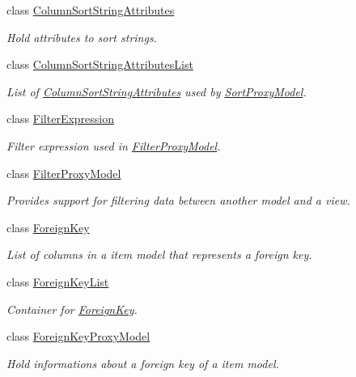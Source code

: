 \begin{DoxyCompactItemize}
class \hyperlink{class_mdt_1_1_item_model_1_1_column_sort_string_attributes}{Column\+Sort\+String\+Attributes}
\begin{DoxyCompactList}\small\item\em Hold attributes to sort strings. \end{DoxyCompactList}\item 
class \hyperlink{class_mdt_1_1_item_model_1_1_column_sort_string_attributes_list}{Column\+Sort\+String\+Attributes\+List}
\begin{DoxyCompactList}\small\item\em List of \hyperlink{class_mdt_1_1_item_model_1_1_column_sort_string_attributes}{Column\+Sort\+String\+Attributes} used by \hyperlink{class_mdt_1_1_item_model_1_1_sort_proxy_model}{Sort\+Proxy\+Model}. \end{DoxyCompactList}\item 
class \hyperlink{class_mdt_1_1_item_model_1_1_filter_expression}{Filter\+Expression}
\begin{DoxyCompactList}\small\item\em Filter expression used in \hyperlink{class_mdt_1_1_item_model_1_1_filter_proxy_model}{Filter\+Proxy\+Model}. \end{DoxyCompactList}\item 
class \hyperlink{class_mdt_1_1_item_model_1_1_filter_proxy_model}{Filter\+Proxy\+Model}
\begin{DoxyCompactList}\small\item\em Provides support for filtering data between another model and a view. \end{DoxyCompactList}\item 
class \hyperlink{class_mdt_1_1_item_model_1_1_foreign_key}{Foreign\+Key}
\begin{DoxyCompactList}\small\item\em List of columns in a item model that represents a foreign key. \end{DoxyCompactList}\item 
class \hyperlink{class_mdt_1_1_item_model_1_1_foreign_key_list}{Foreign\+Key\+List}
\begin{DoxyCompactList}\small\item\em Container for \hyperlink{class_mdt_1_1_item_model_1_1_foreign_key}{Foreign\+Key}. \end{DoxyCompactList}\item 
class \hyperlink{class_mdt_1_1_item_model_1_1_foreign_key_proxy_model}{Foreign\+Key\+Proxy\+Model}
\begin{DoxyCompactList}\small\item\em Hold informations about a foreign key of a item model. \end{DoxyCompactList}\item 

\end{DoxyCompactItemize}
